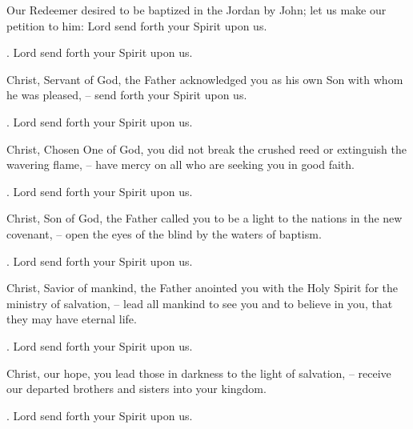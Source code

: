 \lettrine[loversize=0.15,lines=2]{O}{}ur Redeemer desired to be baptized in the Jordan by John; let us make our petition to him: Lord send forth your Spirit upon us.
\par \Rbar. Lord send forth your Spirit upon us.

Christ, Servant of God, the Father acknowledged you as his own Son with whom he was pleased,
– send forth your Spirit upon us.
\par \Rbar. Lord send forth your Spirit upon us.

Christ, Chosen One of God, you did not break the crushed reed or extinguish the wavering flame,
– have mercy on all who are seeking you in good faith.
\par \Rbar. Lord send forth your Spirit upon us.

Christ, Son of God, the Father called you to be a light to the nations in the new covenant,
– open the eyes of the blind by the waters of baptism.
\par \Rbar. Lord send forth your Spirit upon us.

Christ, Savior of mankind, the Father anointed you with the Holy Spirit for the ministry of salvation,
– lead all mankind to see you and to believe in you, that they may have eternal life.
\par \Rbar. Lord send forth your Spirit upon us.

Christ, our hope, you lead those in darkness to the light of salvation,
– receive our departed brothers and sisters into your kingdom.
\par \Rbar. Lord send forth your Spirit upon us.